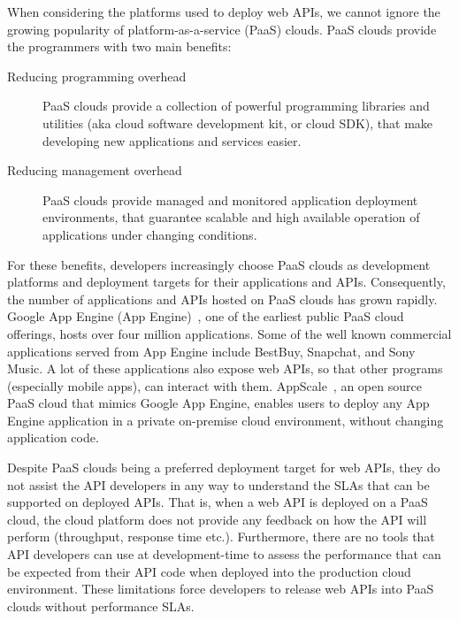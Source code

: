 When considering the platforms used to deploy web APIs, we cannot ignore the
growing popularity of platform-as-a-service (PaaS) clouds.
PaaS clouds provide the programmers with two main benefits:

\begin{description}
\item[Reducing programming overhead] PaaS clouds provide a collection of powerful programming 
libraries and utilities (aka cloud software development kit, or cloud SDK), that make developing new applications 
and services easier.
\item[Reducing management overhead] PaaS clouds provide managed and monitored application deployment
environments, that guarantee scalable and high available operation of applications under changing conditions.
\end{description}

For these benefits, developers increasingly choose PaaS clouds as development platforms
and deployment targets for their applications and APIs. Consequently, the number of applications and 
APIs hosted on PaaS clouds has grown rapidly. Google App Engine (App Engine)~\cite{gae}, one of the earliest
public PaaS cloud offerings, hosts over four million applications. Some of the
well known commercial applications served from App Engine include BestBuy, Snapchat, 
and Sony Music. A lot of these applications also expose web APIs, so that other
programs (especially mobile apps), can interact with them. AppScale~\cite{6488671}, an open source PaaS cloud that
mimics Google App Engine, enables users to deploy any App Engine application in a private on-premise
cloud environment, without changing application code.

Despite PaaS clouds being a preferred deployment target for web APIs, they do not assist the API
developers in any way to understand the SLAs that can be supported on deployed APIs. That is,
when a web API is deployed on a PaaS cloud, the cloud platform does not provide any feedback 
on how the API will perform (throughput, response time etc.). Furthermore,
there are no tools that API developers can use at development-time to assess the performance
that can be expected from their API code when deployed into the production cloud environment.
These limitations force developers to release web APIs into PaaS clouds without performance SLAs.

